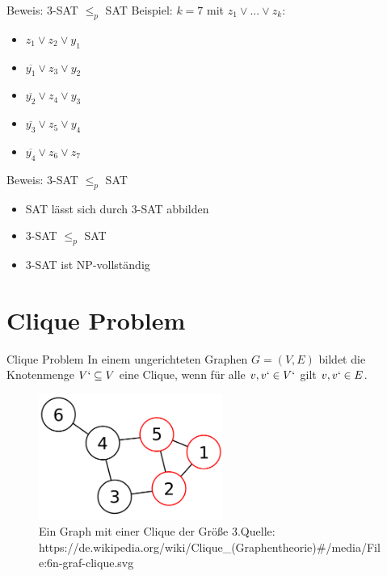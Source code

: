 \documentclass[12pt,donthandout,notes=dontshow,xcolor=table]{beamer}
\begin{document}
\begin{frame}{Beweis: 3-SAT \(\leq_p\) SAT}
Beispiel: \(k = 7\) mit \(z_1 \vee ... \vee z_k\):
\begin{itemize}
\item \(z_1 \vee z_2 \vee y_1\)
\item \(\overline{y_1} \vee z_3 \vee y_2\)
\item \(\overline{y_2} \vee z_4 \vee y_3\)
\item \(\overline{y_3} \vee z_5 \vee y_4\)
\item \(\overline{y_4} \vee z_6 \vee z_7\)\\
\end{itemize}
\end{frame}

\begin{frame}{Beweis: 3-SAT \(\leq_p\) SAT}
\begin{itemize}
\item SAT lässt sich durch 3-SAT abbilden
\item 3-SAT \(\leq_p\) SAT
\item 3-SAT ist NP-vollständig
\end{itemize}
\end{frame}

\section{Clique Problem}
\begin{frame}{Clique Problem}
In einem ungerichteten Graphen $G = (V,E)$ bildet die Knotenmenge $V` \subseteq V$ eine Clique, wenn für alle $v, v` \in V`$ gilt ${v,v`} \in E$. \cite{wegener}
\pause
\begin{figure}
\includegraphics[width=6cm]{figures/clique1.png}
\caption{Ein Graph mit einer Clique der Größe 3.\newline \newline \tiny Quelle: https://de.wikipedia.org/wiki/Clique\_(Graphentheorie)\#/media/File:6n-graf-clique.svg}
\end{figure}
\end{frame}
\end{document}
